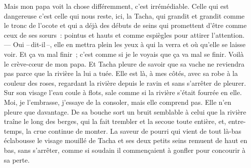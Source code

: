 \pend
%
\pstart
	Mais mon papa voit la chose différemment, c’est irrémédiable. Celle qui est dangereuse c’est celle qui nous reste, ici, la Tacha, qui grandit et grandit comme le tronc de l’ocote et qui a déjà des débuts de seins qui promettent d’être comme ceux de ses sœurs : pointus et hauts et comme espiègles pour attirer l’attention.
\pend
%
\pstart
	--- Oui --\,dit-il\,--, elle en mettra plein les yeux à qui la verra et où qu’elle se laisse voir. Et ça va mal finir ; c’est comme si je le voyais que ça va mal se finir.
	Voilà le crève-cœur de mon papa.
\pend
%
\pstart
	Et Tacha pleure de savoir que sa vache ne reviendra pas parce que la rivière la lui a tuée. Elle est là, à mes côtés, avec sa robe à la couleur des roses, regardant la rivière depuis le ravin et sans s’arrêter de pleurer. Sur son visage l’eau coule à flots, sale comme si la rivière s’était fourrée en elle.
\pend
%
\pstart
	Moi, je l’embrasse, j’essaye de la consoler, mais elle comprend pas. Elle n’en pleure que davantage. De sa bouche sort un bruit semblable à celui que la rivière traîne le long des berges, qui la fait trembler et la secoue toute entière, et, entre-temps, la crue continue de monter. La saveur de pourri qui vient de tout là-bas éclabousse le visage mouillé de Tacha et ses deux petits seins remuent de haut en bas, sans s’arrêter, comme si soudain il commençaient à gonfler pour concourir à sa perte.
\pend
